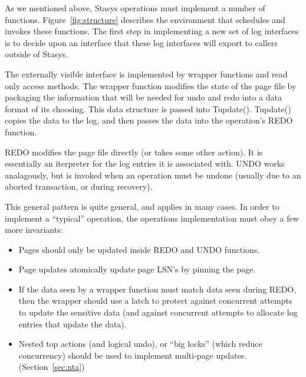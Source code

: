 \documentclass[letterpaper,twocolumn,10pt]{article}
\newcommand{\yad}{Stasys\xspace}
\begin{document}
As we mentioned above, \yad operations must implement a number of
functions.  Figure~\ref{fig:structure} describes the environment that
schedules and invokes these functions.  The first step in implementing
a new set of log interfaces is to decide upon an interface that these log
interfaces will export to callers outside of \yad.  

The externally visible interface is implemented by wrapper functions
and read only access methods.  The wrapper function modifies the state
of the page file by packaging the information that will be needed for
undo and redo into a data format of its choosing.  This data structure
is passed into Tupdate().  Tupdate() copies the data to the log, and
then passes the data into the operation's REDO function.
 
REDO modifies the page file directly (or takes some other action).  It
is essentially an iterpreter for the log entries it is associated
with.  UNDO works analagously, but is invoked when an operation must
be undone (usually due to an aborted transaction, or during recovery).

This general pattern is quite general, and applies in many cases.  In
order to implement a ``typical'' operation, the operations
implementation must obey a few more invariants:

\begin{itemize}
\item Pages should only be updated inside REDO and UNDO functions.
\item Page updates atomically update page LSN's by pinning the page.
\item If the data seen by a wrapper function must match data seen
  during REDO, then the wrapper should use a latch to protect against
  concurrent attempts to update the sensitive data (and against
  concurrent attempts to allocate log entries that update the data).
\item Nested top actions (and logical undo), or ``big locks'' (which
  reduce concurrency) should be used to implement multi-page updates. (Section~\ref{sec:nta})
\end{itemize}
\end{document}
